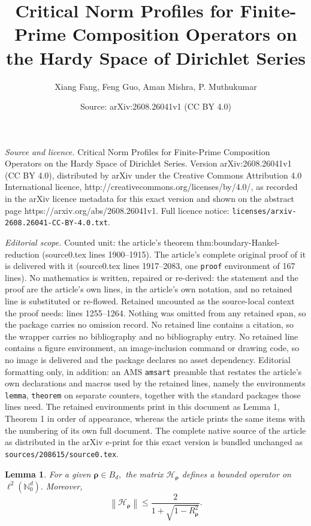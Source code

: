 \documentclass[10pt,a4paper]{amsart}
\title{Critical Norm Profiles for Finite-Prime Composition Operators on the Hardy Space of Dirichlet Series}
\author{Xiang Fang, Feng Guo, Aman Mishra, P. Muthukumar}
\date{Source: arXiv:2608.26041v1 (CC BY 4.0)}
\newtheorem{lemma}{Lemma}
\begin{document}
\maketitle

\noindent\emph{Source and licence.} Critical Norm Profiles for Finite-Prime Composition Operators on the Hardy Space of Dirichlet Series. Version arXiv:2608.26041v1 (CC BY 4.0), distributed by arXiv under the Creative Commons Attribution 4.0 International licence, http://creativecommons.org/licenses/by/4.0/, as recorded in the arXiv licence metadata for this exact version and shown on the abstract page https://arxiv.org/abs/2608.26041v1. Full licence notice: \texttt{licenses/arxiv-2608.26041-CC-BY-4.0.txt}.\par\smallskip

\noindent\textit{Editorial scope.} Counted unit: the article's theorem thm:boundary-Hankel-reduction (source0.tex lines 1900--1915). The article's complete original proof of it is delivered with it (source0.tex lines 1917--2083, one \texttt{proof} environment of 167 lines). No mathematics is written, repaired or re-derived: the statement and the proof are the article's own lines, in the article's own notation, and no retained line is substituted or re-flowed.  Retained uncounted as the source-local context the proof needs: lines 1255--1264.  Nothing was omitted from any retained span, so the package carries no omission record.  No retained line contains a citation, so the wrapper carries no bibliography and no bibliography entry.  No retained line contains a figure environment, an image-inclusion command or drawing code, so no image is delivered and the package declares no asset dependency.  Editorial formatting only, in addition: an AMS \texttt{amsart} preamble that restates the article's own declarations and macros used by the retained lines, namely the environments \texttt{lemma}, \texttt{theorem} on separate counters, together with the standard packages those lines need.  The retained environments print in this document as Lemma 1, Theorem 1 in order of appearance, whereas the article prints the same items with the numbering of its own full document.  The complete native source of the article as distributed in the arXiv e-print for this exact version is bundled unchanged as \texttt{sources/208615/source0.tex}.
\begin{lemma}
\label{lem:fp-boundedness-H-rho}
For a given $\boldsymbol{\rho}\in B_d,$  the matrix $\mathcal{H}_{\boldsymbol{\rho}}$ defines a bounded  operator on $\ell^2(\mathbb{N}_{0}^{d}).$
Moreover,
\[
\left\|\mathcal{H}_{\boldsymbol{\rho}}\right\|
\leq
\frac{2}{1+\sqrt{1-R_{\boldsymbol{\rho}}^2}}.
\]
\end{lemma}
\end{document}
